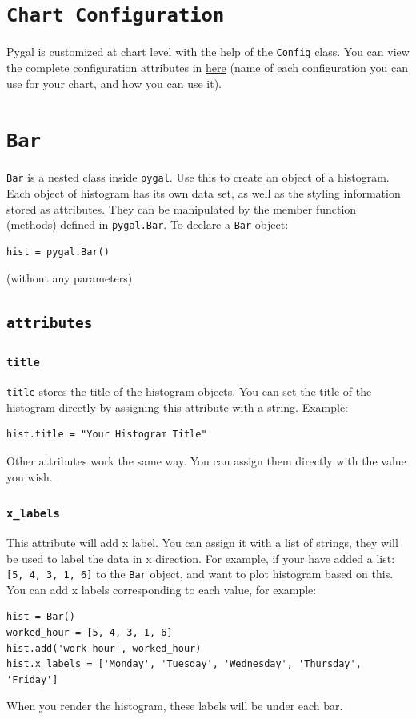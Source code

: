 \documentclass[12pt]{book}
\begin{document}
\section{\texttt{Chart Configuration}}
\label{sec:org1cfd59e}
Pygal is customized at chart level with the help of the \texttt{Config} class. You can view the complete configuration attributes in \href{http://www.pygal.org/en/stable/documentation/configuration/chart.html}{here} (name of each configuration you can use for your chart, and how you can use it).
\section{\texttt{Bar}}
\label{sec:orga9aeb73}
\texttt{Bar} is a nested class inside \texttt{pygal}. Use this to create an object of a histogram. Each object of histogram has its own data set, as well as the styling information stored as attributes. They can be manipulated by the member function (methods) defined in \texttt{pygal.Bar}. To declare a \texttt{Bar} object:
\begin{verbatim}
hist = pygal.Bar()
\end{verbatim}
(without any parameters)

\subsection{\texttt{attributes}}
\label{sec:org1d11070}
\subsubsection{\texttt{title}}
\label{sec:org87cfb0e}
\texttt{title} stores the title of the histogram objects. You can set the title of the histogram directly by assigning this attribute with a string. Example:
\begin{verbatim}
hist.title = "Your Histogram Title"
\end{verbatim}
Other attributes work the same way. You can assign them directly with the value you wish.
\subsubsection{\texttt{x\_labels}}
\label{sec:orgf0ee4aa}
This attribute will add x label. You can assign it with a list of strings, they will be used to label the data in x direction. For example, if your have added a list: \texttt{[5, 4, 3, 1, 6]} to the \texttt{Bar} object, and want to plot histogram based on this. You can add x labels corresponding to each value, for example:
\begin{verbatim}
hist = Bar()
worked_hour = [5, 4, 3, 1, 6]
hist.add('work hour', worked_hour)
hist.x_labels = ['Monday', 'Tuesday', 'Wednesday', 'Thursday', 'Friday']
\end{verbatim}
When you render the histogram, these labels will be under each bar.
\end{document}
